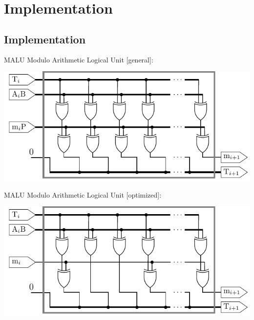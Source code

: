 \documentclass{beamer}
\begin{document}
\section{Implementation}
\subsection*{Implementation}
\begin{frame}[t]{MALU}
	Modulo Arithmetic Logical Unit [general]:\\
	\begin{center}
		\includegraphics[height=0.5\paperheight]{images/malu-core-basic}
	\end{center}
\end{frame}

\begin{frame}[t]{MALU}
	Modulo Arithmetic Logical Unit [optimized]:\\
	\begin{center}
		\includegraphics[height=0.5\paperheight]{images/malu-core-optimized}
	\end{center}
\end{frame}
\end{document}
